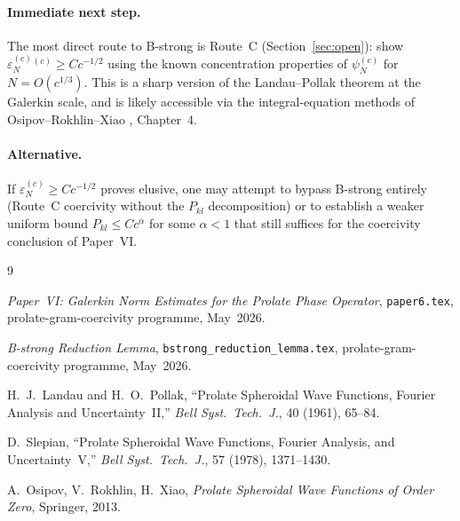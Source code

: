 \documentclass[12pt,a4paper]{article}
\newcommand{\eps}[1]{\varepsilon_{#1}^{(c)}}
\newcommand{\pswf}[1]{\psi_{#1}^{(c)}}
\begin{document}
\paragraph{Immediate next step.}
The most direct route to B-strong is
Route~C (Section~\ref{sec:open}):
show $\eps{N}^{(c)} \geq Cc^{-1/2}$ using
the known concentration properties of $\pswf{N}$
for $N = O(c^{1/3})$.
This is a sharp version of the Landau--Pollak theorem
at the Galerkin scale, and is likely accessible
via the integral-equation methods of
Osipov--Rokhlin--Xiao \cite{ORX2013}, Chapter~4.

\paragraph{Alternative.}
If $\eps{N} \geq Cc^{-1/2}$ proves elusive,
one may attempt to bypass B-strong entirely
(Route~C coercivity without the $P_{kl}$ decomposition)
or to establish a weaker uniform bound
$P_{kl} \leq Cc^\alpha$ for some $\alpha < 1$
that still suffices for the coercivity conclusion
of Paper~VI.

\begin{thebibliography}{9}

  \textit{Paper~VI: Galerkin Norm Estimates for the Prolate Phase Operator},
  \texttt{paper6.tex}, prolate-gram-coercivity programme, May~2026.

  \textit{B-strong Reduction Lemma},
  \texttt{bstrong\_reduction\_lemma.tex},
  prolate-gram-coercivity programme, May~2026.

  H.~J.~Landau and H.~O.~Pollak,
  ``Prolate Spheroidal Wave Functions, Fourier Analysis and
  Uncertainty~II,''
  \textit{Bell Syst.\ Tech.\ J.}, 40 (1961), 65--84.

  D.~Slepian,
  ``Prolate Spheroidal Wave Functions, Fourier Analysis, and
  Uncertainty~V,''
  \textit{Bell Syst.\ Tech.\ J.}, 57 (1978), 1371--1430.

  A.~Osipov, V.~Rokhlin, H.~Xiao,
  \textit{Prolate Spheroidal Wave Functions of Order Zero},
  Springer, 2013.

\end{thebibliography}
\end{document}
